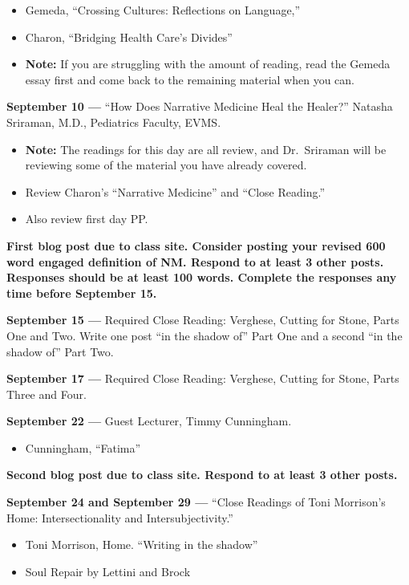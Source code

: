 \documentclass[12pt]{article}
\providecommand{\tightlist}{%
  \setlength{\itemsep}{0pt}\setlength{\parskip}{0pt}}
\begin{document}
\begin{itemize}
\tightlist
\item
  Gemeda, ``Crossing Cultures: Reflections on Language,''
\item
  Charon, ``Bridging Health Care's Divides''
\item
  \textbf{Note:} If you are struggling with the amount of reading, read
  the Gemeda essay first and come back to the remaining material when
  you can.
\end{itemize}

\textbf{September 10 ---} ``How Does Narrative Medicine Heal the
Healer?'' Natasha Sriraman, M.D., Pediatrics Faculty, EVMS.

\begin{itemize}
\tightlist
\item
  \textbf{Note:} The readings for this day are all review, and
  Dr.~Sriraman will be reviewing some of the material you have already
  covered.
\item
  Review Charon's ``Narrative Medicine'' and ``Close Reading.''
\item
  Also review first day PP.
\end{itemize}

\textbf{First blog post due to class site. Consider posting your revised
600 word engaged definition of NM. Respond to at least 3 other posts.
Responses should be at least 100 words. Complete the responses any time
before September 15.}

\textbf{September 15 ---} Required Close Reading: Verghese, Cutting for
Stone, Parts One and Two. Write one post ``in the shadow of'' Part One
and a second ``in the shadow of'' Part Two.

\textbf{September 17 ---} Required Close Reading: Verghese, Cutting for
Stone, Parts Three and Four.

\textbf{September 22 ---} Guest Lecturer, Timmy Cunningham.

\begin{itemize}
\tightlist
\item
  Cunningham, ``Fatima''
\end{itemize}

\textbf{Second blog post due to class site. Respond to at least 3 other
posts.}

\textbf{September 24 and September 29 ---} ``Close Readings of Toni
Morrison's Home: Intersectionality and Intersubjectivity.''

\begin{itemize}
\tightlist
\item
  Toni Morrison, Home. ``Writing in the shadow''
\item
  Soul Repair by Lettini and Brock
\end{itemize}
\end{document}
